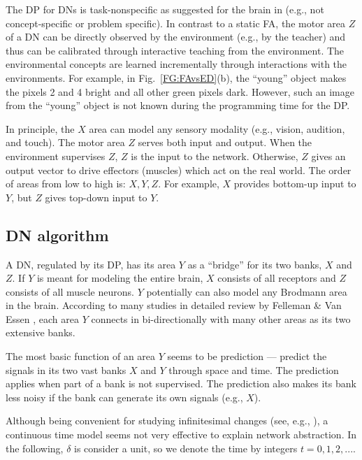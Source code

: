 \documentclass[conference]{IEEEtran}
\begin{document}
The DP for DNs is task-nonspecific as suggested for the brain in \cite{WengScience} 
(e.g., not concept-specific or problem specific).   
In contrast to a static FA, the motor area $Z$ of a DN can be directly observed by the environment (e.g., by the teacher) and thus can be calibrated through interactive teaching from the environment.   
The environmental concepts are learned incrementally through interactions with the environments.  
For example, in Fig.~\ref{FG:FAvsED}(b), the ``young'' object makes the pixels 2 and 4 bright and all other green pixels dark.  However, such 
an image from the ``young'' object is not known during the programming time for the DP.   

In principle, the $X$ area can model any sensory modality (e.g., vision, audition, and touch). 
The motor area $Z$ serves both input and output.  When the environment supervises $Z$, $Z$ is the input
to the network.  Otherwise, $Z$ gives an output vector to drive effectors (muscles) which act on the real world. 
The order of areas from low to high is: $X, Y, Z$.   For example, 
$X$ provides bottom-up input to $Y$, but $Z$ gives top-down input to $Y$.  

\subsection{DN algorithm}
A DN, regulated by its DP, has its area $Y$ as a ``bridge'' for its two banks, $X$ and $Z$.
If $Y$ is meant for modeling the entire brain, $X$ consists of all receptors and $Z$ consists of all muscle 
neurons.   $Y$ potentially can also model any Brodmann area in the brain.   According to 
many studies in detailed review
by Felleman \& Van Essen \cite{FellemanVanEssen91}, each area $Y$ connects in bi-directionally with many other
areas as its two extensive banks.  

The most basic function of an area $Y$ seems to be prediction --- predict the signals in its two vast banks $X$ and $Y$ through
space and time.   The prediction applies when part of a bank is not supervised. 
The prediction also makes its bank less noisy if the bank can generate its own signals (e.g., $X$).    

Although being convenient for studying infinitesimal changes (see, e.g., \cite{Izhikevich07}), a continuous time model  seems not very effective to explain network abstraction.   In the following, $\delta$ is consider a unit, so we denote the time by integers $t=0, 1, 2, ...$.  
\end{document}
